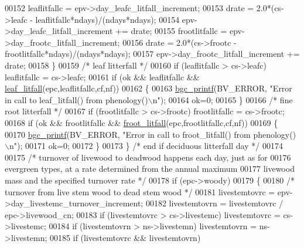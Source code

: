 \begin{DoxyCode}
00152                 leaflitfallc = epv->day\_leafc\_litfall\_increment;
00153                 drate = 2.0*(cs->leafc - leaflitfallc*ndays)/(ndays*ndays);
00154                 epv->day\_leafc\_litfall\_increment += drate;
00155                 frootlitfallc = epv->day\_frootc\_litfall\_increment;
00156                 drate = 2.0*(cs->frootc - frootlitfallc*ndays)/(ndays*ndays);
00157                 epv->day\_frootc\_litfall\_increment += drate;
00158             \}
00159             \textcolor{comment}{/* leaf litterfall */}
00160             \textcolor{keywordflow}{if} (leaflitfallc > cs->leafc) leaflitfallc = cs->leafc;
00161             \textcolor{keywordflow}{if} (ok && leaflitfallc && \hyperlink{phenology_8c_a6400c77226b2dd734e44323a5a2c9d64}{leaf\_litfall}(epc,leaflitfallc,cf,nf))
00162             \{
00163                 \hyperlink{bgc__io_8c_af287cce6e2aede1ce337de9319e80d0d}{bgc\_printf}(BV\_ERROR, \textcolor{stringliteral}{"Error in call to leaf\_litfall() from phenology()\(\backslash\)n"});
00164                 ok=0;
00165             \}
00166             \textcolor{comment}{/* fine root litterfall */}
00167             \textcolor{keywordflow}{if} (frootlitfallc > cs->frootc) frootlitfallc = cs->frootc;
00168             \textcolor{keywordflow}{if} (ok && frootlitfallc && \hyperlink{phenology_8c_ac9d84f39b7db5a7498a0ac0f9edffd1f}{froot\_litfall}(epc,frootlitfallc,cf,nf))
00169             \{
00170                 \hyperlink{bgc__io_8c_af287cce6e2aede1ce337de9319e80d0d}{bgc\_printf}(BV\_ERROR, \textcolor{stringliteral}{"Error in call to froot\_litfall() from phenology()\(\backslash\)n"});
00171                 ok=0;
00172             \}
00173         \} \textcolor{comment}{/* end if deciduous litterfall day */}
00174         
00175         \textcolor{comment}{/* turnover of livewood to deadwood happens each day, just as for}
00176 \textcolor{comment}{        evergreen types, at a rate determined from the annual maximum}
00177 \textcolor{comment}{        livewood mass and the specified turnover rate */}
00178         \textcolor{keywordflow}{if} (epc->woody)
00179         \{
00180             \textcolor{comment}{/* turnover from live stem wood to dead stem wood */}
00181             livestemtovrc = epv->day\_livestemc\_turnover\_increment;
00182             livestemtovrn = livestemtovrc / epc->livewood\_cn;
00183             \textcolor{keywordflow}{if} (livestemtovrc > cs->livestemc) livestemtovrc = cs->livestemc;
00184             \textcolor{keywordflow}{if} (livestemtovrn > ns->livestemn) livestemtovrn = ns->livestemn;
00185             \textcolor{keywordflow}{if} (livestemtovrc && livestemtovrn)

\end{DoxyCode}
